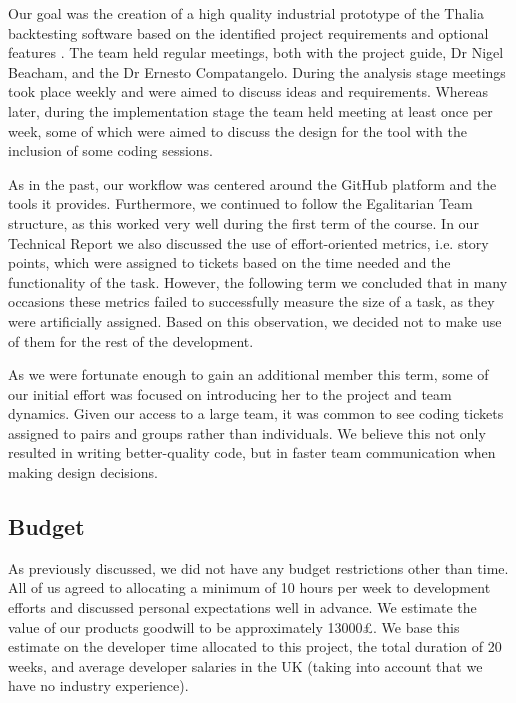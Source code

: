 \documentclass[main.tex]{subfiles}
\begin{document}
Our goal was the creation of a high quality industrial prototype of the Thalia backtesting software based on the identified project requirements \cite{TR_REQS} and optional features \cite{TR_OPTIONAL_FEATURES}. The team held regular meetings, both with the project guide, Dr Nigel Beacham, and the Dr Ernesto Compatangelo. During the analysis stage meetings took place weekly and were aimed to discuss ideas and requirements. Whereas later, during the implementation stage the team held meeting at least once per week, some of which were aimed to discuss the design for the tool with the inclusion of some coding sessions.

As in the past\cite{TR_TO}, our workflow was centered around the GitHub platform and the tools it provides.
Furthermore, we continued to follow the Egalitarian Team structure, as this worked very well during the first term of the course.
In our Technical Report \cite{TR_story} we also discussed the use of effort-oriented metrics, i.e. story points, which were assigned to tickets based on the time needed and the functionality of the task.
However, the following term we concluded that in many occasions these metrics failed to successfully measure the size of a task, as they were artificially assigned. Based on this observation, we decided not to make use of them for the rest of the development.

As we were fortunate enough to gain an additional member this term, some of our initial effort was focused on introducing her to the project and team dynamics. Given our access to a large team, it was common to see coding tickets assigned to pairs and groups rather than individuals. We believe this not only resulted in writing better-quality code, but in faster team communication when making design decisions.

\subsection{Budget}
As previously discussed, we did not have any budget restrictions other than time. All of us agreed to allocating a minimum of 10 hours per week to development efforts and discussed personal expectations well in advance.  We estimate the value of our products goodwill to be approximately 13000£. We base this estimate on the developer time allocated to this project, the total duration of 20 weeks, and average developer salaries in the UK\cite{DeveloperSalary} (taking into account that we have no industry experience).
\end{document}
